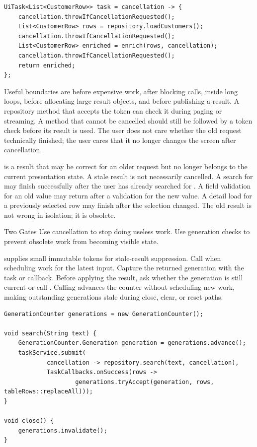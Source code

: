 \begin{lstlisting}[caption={Cooperative cancellation points.}]
UiTask<List<CustomerRow>> task = cancellation -> {
    cancellation.throwIfCancellationRequested();
    List<CustomerRow> rows = repository.loadCustomers();
    cancellation.throwIfCancellationRequested();
    List<CustomerRow> enriched = enrich(rows, cancellation);
    cancellation.throwIfCancellationRequested();
    return enriched;
};
\end{lstlisting}

Useful boundaries are before expensive work, after blocking calls, inside long
loops, before allocating large result objects, and before publishing a result.
A repository method that accepts the token can check it during paging or
streaming. A method that cannot be cancelled should still be followed by a
token check before its result is used. The user does not care whether the old
request technically finished; the user cares that it no longer changes the
screen after cancellation.

 is a result that may be
correct for an older request but no longer belongs to the current presentation
state. A stale result is not necessarily cancelled. A search for  may
finish successfully after the user has already searched for . A
field validation for an old value may return after a validation for the new
value. A detail load for a previously selected row may finish after the
selection changed. The old result is not wrong in isolation; it is obsolete.

\begin{principlebox}{Two Gates}
Use cancellation to stop doing useless work. Use generation checks to prevent
obsolete work from becoming visible state.
\end{principlebox}

 supplies small immutable tokens for stale-result
suppression. Call  when scheduling work for the latest input.
Capture the returned generation with the task or callback. Before applying the
result, ask whether the generation is still current or call .
Calling  advances the counter without scheduling new work,
making outstanding generations stale during close, clear, or reset paths.

\begin{lstlisting}[caption={Suppressing stale search results.}]
GenerationCounter generations = new GenerationCounter();

void search(String text) {
    GenerationCounter.Generation generation = generations.advance();
    taskService.submit(
            cancellation -> repository.search(text, cancellation),
            TaskCallbacks.onSuccess(rows ->
                    generations.tryAccept(generation, rows, tableRows::replaceAll)));
}

void close() {
    generations.invalidate();
}
\end{lstlisting}

